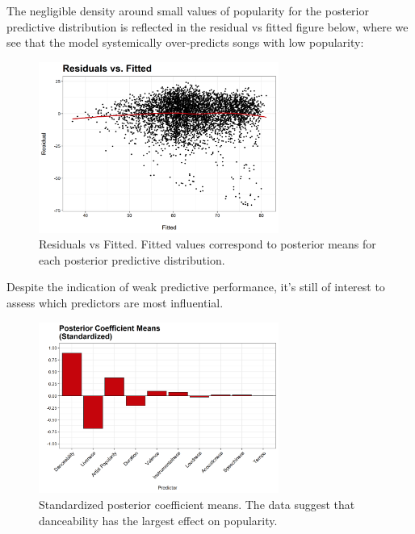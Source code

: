 \documentclass[12pt, twoside]{article}
\begin{document}
The negligible density around small values of popularity for the posterior predictive distribution is reflected in the residual vs fitted figure below, where we see that the model systemically over-predicts songs with low popularity:

\begin{figure}[H] %
\centering
\includegraphics[width=0.7\textwidth]{residuals.png} %
\caption{Residuals vs Fitted. Fitted values correspond to posterior means for each posterior predictive distribution.}
\label{fig:residuals} %
\end{figure}

Despite the indication of weak predictive performance, it's still of interest to assess which predictors are most influential. 

\begin{figure}[H] %
\centering
\includegraphics[width=0.7\textwidth]{standardized_coeffs.png} %
\caption{Standardized posterior coefficient means. The data suggest that danceability has the largest effect on popularity.}
\label{fig:standardized_coefs} %
\end{figure}
\end{document}
